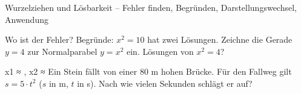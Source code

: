 \begin{aufgabe}{Wurzelziehen und Lösbarkeit – Fehler finden, Begründen, Darstellungswechsel, Anwendung}
\begin{teile}
\teil Wo ist der Fehler? 
\teil Begründe: $x^2 = 10$ hat zwei Lösungen.
\teil Zeichne die Gerade $y = 4$ zur Normalparabel $y = x^2$ ein. Lösungen von $x^2 = 4$?

\begin{ksys}[xmin=-3,xmax=3,ymin=-1,ymax=6]  \end{ksys}
x1 ≈ \leerfeld , x2 ≈ \leerfeld
\teil Ein Stein fällt von einer $80$ m hohen Brücke. Für den Fallweg gilt $s = 5 \cdot t^2$ ($s$ in m, $t$ in s). Nach wie vielen Sekunden schlägt er auf? \leerfeld[s]
\end{teile}
\end{aufgabe}
